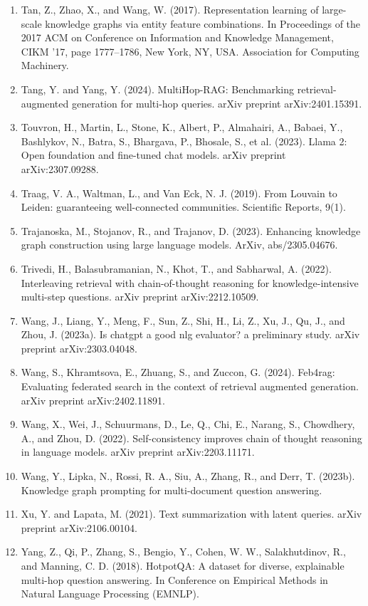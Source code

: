 \documentclass[11pt,UTF8,fontset=fandol]{ctexart}
\begin{document}
\begin{enumerate}[leftmargin=2em]
\item Tan, Z., Zhao, X., and Wang, W. (2017). Representation learning of large-scale knowledge graphs via entity feature combinations. In Proceedings of the 2017 ACM on Conference on Information and Knowledge Management, CIKM '17, page 1777--1786, New York, NY, USA. Association for Computing Machinery.
\item Tang, Y. and Yang, Y. (2024). MultiHop-RAG: Benchmarking retrieval-augmented generation for multi-hop queries. arXiv preprint arXiv:2401.15391.
\item Touvron, H., Martin, L., Stone, K., Albert, P., Almahairi, A., Babaei, Y., Bashlykov, N., Batra, S., Bhargava, P., Bhosale, S., et al. (2023). Llama 2: Open foundation and fine-tuned chat models. arXiv preprint arXiv:2307.09288.
\item Traag, V. A., Waltman, L., and Van Eck, N. J. (2019). From Louvain to Leiden: guaranteeing well-connected communities. Scientific Reports, 9(1).
\item Trajanoska, M., Stojanov, R., and Trajanov, D. (2023). Enhancing knowledge graph construction using large language models. ArXiv, abs/2305.04676.
\item Trivedi, H., Balasubramanian, N., Khot, T., and Sabharwal, A. (2022). Interleaving retrieval with chain-of-thought reasoning for knowledge-intensive multi-step questions. arXiv preprint arXiv:2212.10509.
\item Wang, J., Liang, Y., Meng, F., Sun, Z., Shi, H., Li, Z., Xu, J., Qu, J., and Zhou, J. (2023a). Is chatgpt a good nlg evaluator? a preliminary study. arXiv preprint arXiv:2303.04048.
\item Wang, S., Khramtsova, E., Zhuang, S., and Zuccon, G. (2024). Feb4rag: Evaluating federated search in the context of retrieval augmented generation. arXiv preprint arXiv:2402.11891.
\item Wang, X., Wei, J., Schuurmans, D., Le, Q., Chi, E., Narang, S., Chowdhery, A., and Zhou, D. (2022). Self-consistency improves chain of thought reasoning in language models. arXiv preprint arXiv:2203.11171.
\item Wang, Y., Lipka, N., Rossi, R. A., Siu, A., Zhang, R., and Derr, T. (2023b). Knowledge graph prompting for multi-document question answering.
\item Xu, Y. and Lapata, M. (2021). Text summarization with latent queries. arXiv preprint arXiv:2106.00104.
\item Yang, Z., Qi, P., Zhang, S., Bengio, Y., Cohen, W. W., Salakhutdinov, R., and Manning, C. D. (2018). HotpotQA: A dataset for diverse, explainable multi-hop question answering. In Conference on Empirical Methods in Natural Language Processing (EMNLP).

\end{enumerate}
\end{document}

